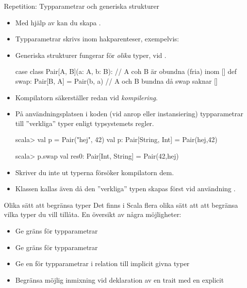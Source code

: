 



\begin{Slide}{Repetition: Typparametrar och generiska strukturer}
\begin{itemize}\SlideFontSmall
\item Med hjälp av   kan du skapa  .
\item Typparametrar skrivs inom hakparenteser, exempelvis: \code{ [T, U] }
\item Generiska strukturer fungerar för \emph{olika} typer,  vid . 
\begin{Code}
case class Pair[A, B](a: A, b: B):  // A coh B är obundna (fria) inom []
  def swap: Pair[B, A] = Pair(b, a) // A och B bundna då swap saknar []
\end{Code}
\pause
\item Kompilatorn säkerställer   redan vid \emph{kompilering}.
\item På användningsplatsen i koden (vid anrop eller instansiering)  typparametrar till ''verkliga'' typer enligt typsystemets regler. 
\begin{REPL}
scala> val p = Pair("hej", 42)
val p: Pair[String, Int] = Pair(hej,42)

scala> p.swap
val res0: Pair[Int, String] = Pair(42,hej)
\end{REPL}
\pause
\item Skriver du inte ut typerna försöker kompilatorn   dem.
\item Klassen  kallas även   då den ''verkliga'' typen skapas först vid användning .
\end{itemize}
\end{Slide}



\begin{Slide}{Olika sätt att begränsa typer}
Det finns i Scala flera olika sätt att att begränsa vilka typer du vill tillåta. En översikt av några möjligheter:
\begin{itemize}
  \item Ge  gräns för typparametrar 
  \item Ge  gräns för typparametrar 
  \item Ge en  för typparametrar i relation till implicit givna typer 
  \item Begränsa möjlig inmixning vid deklaration av en trait med en explicit   
\end{itemize}
\end{Slide}

